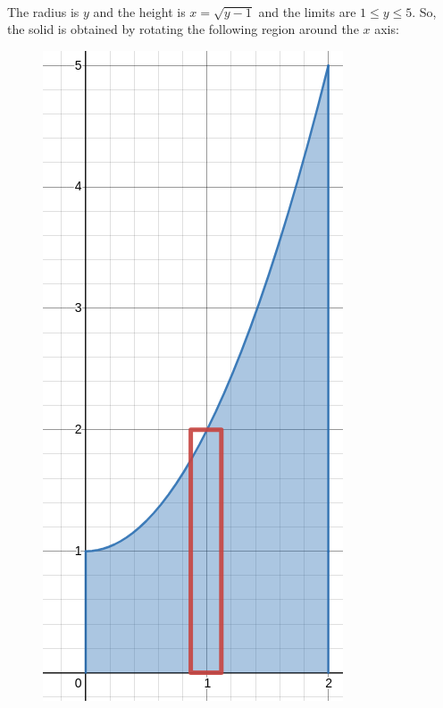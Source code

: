 	\newpage
	
	\\
	The radius is $y$ and the height is $x = \sqrt{y - 1}$ and the limits are $1 \leq y \leq 5$. So, the solid is obtained by rotating the following region around the $x$ axis:
		\begin{figure}[h]
		\centering
		\includegraphics[scale=0.3]{5-3_exo30}
		\end{figure}
	
